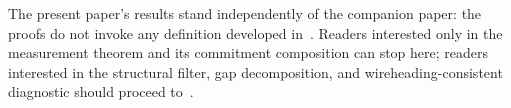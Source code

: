The present paper's results stand independently of the companion
paper: the proofs do not invoke any definition developed
in~\citep[Need~Sufficiency]{lasser2026paper8b}.  Readers interested only in the
measurement theorem and its commitment composition can stop
here; readers interested in the structural filter, gap
decomposition, and wireheading-consistent diagnostic should
proceed to~\citep[Need~Sufficiency]{lasser2026paper8b}.
